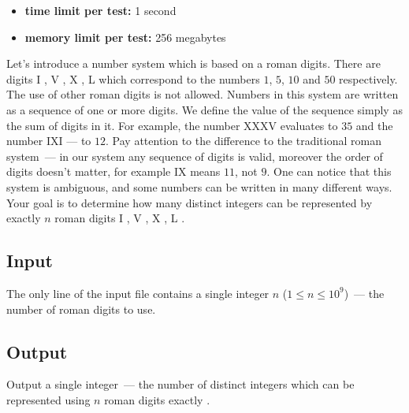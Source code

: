 \documentclass{article}
\begin{document}
\begin{itemize}
\item \textbf{time limit per test:}  1 second
\item \textbf{memory limit per test:}  256 megabytes
\end{itemize}
Let's introduce a number system which is based on a roman digits. There are digits I , V , X , L which correspond to the numbers $1$, $5$, $10$ and $50$ respectively. The use of other roman digits is not allowed. Numbers in this system are written as a sequence of one or more digits. We define the value of the sequence simply as the sum of digits in it. For example, the number XXXV evaluates to $35$ and the number IXI — to $12$. Pay attention to the difference to the traditional roman system — in our system any sequence of digits is valid, moreover the order of digits doesn't matter, for example IX means $11$, not $9$. One can notice that this system is ambiguous, and some numbers can be written in many different ways. Your goal is to determine how many distinct integers can be represented by exactly $n$ roman digits I , V , X , L .

\subsection*{Input}
 The only line of the input file contains a single integer $n$ ($1 \le n \le 10^9$) — the number of roman digits to use.

\subsection*{Output}
 Output a single integer — the number of distinct integers which can be represented using $n$ roman digits exactly .
\end{document}

